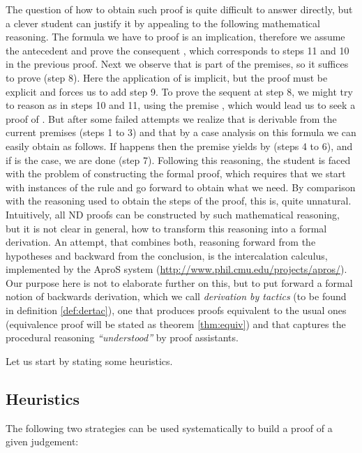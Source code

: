 \documentclass[a4paper,UKenglish]{lipics}
\begin{document}
The question of how to obtain such proof is quite difficult to answer directly, but a clever student can justify it by appealing to the
following mathematical reasoning. The formula we have to proof is an implication, therefore we assume the antecedent  and prove the consequent , which corresponds to steps 11 and 10 in the previous proof. Next we observe that  is part of the premises, so it suffices to prove  (step 8). Here the application of  is implicit, but the proof must be explicit and forces us to add step 9. To prove the sequent at step 8, we might try to reason as in steps 10 and 11, using the premise , which would lead us to seek a proof of . But after some failed attempts we realize that  is derivable from the current premises (steps 1 to 3) and that by a case analysis on this formula we can easily obtain  as follows. If  happens then the premise  yields  by  (steps 4 to 6), and if  is the case, we are done (step 7).  Following this reasoning, the student is faced with the problem of constructing the formal proof, which requires that we start with instances of the  rule and go forward to obtain what we need. By comparison with the reasoning used to obtain the steps of the proof, this is, quite unnatural. Intuitively, all ND proofs can be constructed by such mathematical reasoning, but it is not clear in general, how to transform this reasoning into a formal derivation. An attempt, that combines both, reasoning forward from the hypotheses and backward from the conclusion, is the intercalation calculus, implemented by the {\sc AproS} system (\url{http://www.phil.cmu.edu/projects/apros/}).  Our purpose here is not to elaborate further on this, but to put forward a formal notion of backwards derivation, which we call {\sl derivation by tactics} (to be found in definition \ref{def:dertac}), one that produces proofs equivalent to the usual ones (equivalence proof will be stated as theorem \ref{thm:equiv}) and that captures the procedural reasoning {\sl ``understood''} by proof assistants.

\smallskip
Let us start by stating some heuristics. 

\subsection{Heuristics}\label{ssec:heu}

The following two strategies can be used systematically to build a proof of a given judgement:
\end{document}
